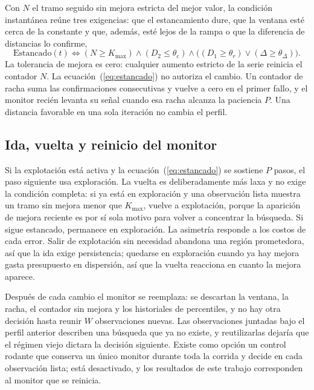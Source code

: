 \documentclass[runningheads]{llncs}
\begin{document}
Con $N$ el tramo seguido sin mejora estricta del mejor valor, la condición instantánea reúne tres exigencias: que el estancamiento dure, que la ventana esté cerca de la constante y que, además, esté lejos de la rampa o que la diferencia de distancias lo confirme,
\begin{equation}
\mathrm{Estancado}(t) \iff
(N \ge K_{\max})
\land (D_2 \le \theta_c)
\land \bigl( (D_1 \ge \theta_r) \lor (\Delta \ge \theta_{\Delta}) \bigr).
\label{eq:estancado}
\end{equation}
La tolerancia de mejora es cero: cualquier aumento estricto de la serie reinicia el contador $N$. La ecuación~(\ref{eq:estancado}) no autoriza el cambio. Un contador de racha suma las confirmaciones consecutivas y vuelve a cero en el primer fallo, y el monitor recién levanta su señal cuando esa racha alcanza la paciencia $P$. Una distancia favorable en una sola iteración no cambia el perfil.

\subsection{Ida, vuelta y reinicio del monitor}
\label{sec:cambio}

Si la explotación está activa y la ecuación~(\ref{eq:estancado}) se sostiene $P$ pasos, el paso siguiente usa exploración. La vuelta es deliberadamente más laxa y no exige la condición completa: si ya está en exploración y una observación lista muestra un tramo sin mejora menor que $K_{\max}$, vuelve a explotación, porque la aparición de mejora reciente es por sí sola motivo para volver a concentrar la búsqueda. Si sigue estancado, permanece en exploración. La asimetría responde a los costos de cada error. Salir de explotación sin necesidad abandona una región prometedora, así que la ida exige persistencia; quedarse en exploración cuando ya hay mejora gasta presupuesto en dispersión, así que la vuelta reacciona en cuanto la mejora aparece.

Después de cada cambio el monitor se reemplaza: se descartan la ventana, la racha, el contador sin mejora y los historiales de percentiles, y no hay otra decisión hasta reunir $W$ observaciones nuevas. Las observaciones juntadas bajo el perfil anterior describen una búsqueda que ya no existe, y reutilizarlas dejaría que el régimen viejo dictara la decisión siguiente. Existe como opción un control rodante que conserva un único monitor durante toda la corrida y decide en cada observación lista; está desactivado, y los resultados de este trabajo corresponden al monitor que se reinicia.
\end{document}
